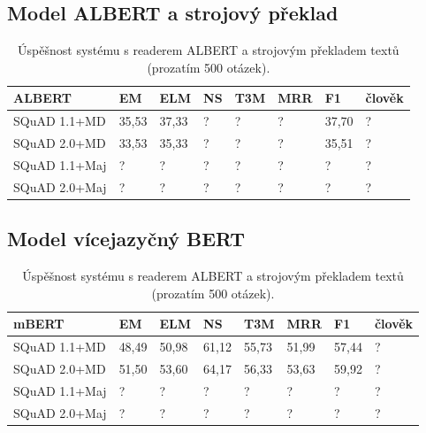 \subsection{Model ALBERT a strojový překlad}
\label{albert_eval}
\begin{table}[H]
    \centering
    \begin{tabular}{|l|l|l|l|l|l|l|l|}
        \hline
        \textbf{ALBERT} & \textbf{EM}    & ELM   & NS    & T3M   & MRR   & \textbf{F1}        & člověk \\ \hline
        SQuAD 1.1+MD    & 35,53 & 37,33 & ?     & ?     & ?     & 37,70     & ?      \\ \hline
        SQuAD 2.0+MD    & 33,53 & 35,33 & ?     & ?     & ?     & 35,51     & ?      \\ \hline
        SQuAD 1.1+Maj   & ?     & ?     & ?     & ?     & ?     & ?         & ?      \\ \hline
        SQuAD 2.0+Maj   & ?     & ?     & ?     & ?     & ?     & ?         & ?      \\ \hline
    \end{tabular}
    \caption{Úspěšnost systému s readerem ALBERT a strojovým překladem textů (prozatím 500 otázek).}
    \label{tab:system_eval_albert}
\end{table}

\subsection{Model vícejazyčný BERT}
\label{mbert_eval}
\begin{table}[H]
    \centering
    \begin{tabular}{|l|l|l|l|l|l|l|l|}
        \hline
        \textbf{mBERT}  & \textbf{EM}    & ELM   & NS    & T3M   & MRR   & \textbf{F1}        & člověk \\ \hline
        SQuAD 1.1+MD    & 48,49 & 50,98 & 61,12 & 55,73 & 51,99 & 57,44     & ?      \\ \hline
        SQuAD 2.0+MD    & 51,50 & 53,60 & 64,17 & 56,33 & 53,63 & 59,92     & ?      \\ \hline
        SQuAD 1.1+Maj   & ?     & ?     & ?     & ?     & ?     & ?         & ?      \\ \hline
        SQuAD 2.0+Maj   & ?     & ?     & ?     & ?     & ?     & ?         & ?      \\ \hline
    \end{tabular}
    \caption{Úspěšnost systému s readerem ALBERT a strojovým překladem textů (prozatím 500 otázek).}
    \label{tab:system_eval_mbert}
\end{table}

